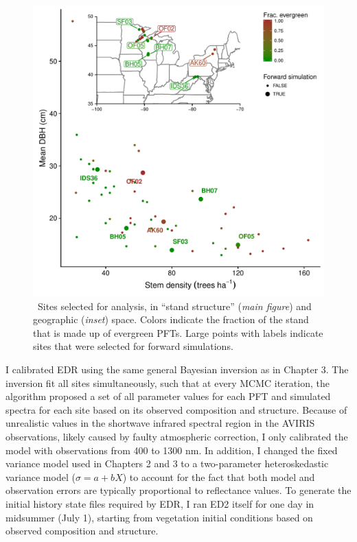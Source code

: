 \begin{figure}
  \centering
  \includegraphics[width=\textwidth]{figures/sites_both.pdf}
  \caption{\
    Sites selected for analysis, in ``stand structure'' (\textit{main figure}) and geographic (\textit{inset}) space.
    Colors indicate the fraction of the stand that is made up of evergreen PFTs.
    Large points with labels indicate sites that were selected for forward simulations.
  }\label{fig:sites}
\end{figure}
% 
% 

I calibrated EDR using the same general Bayesian inversion as in Chapter 3.
The inversion fit all sites simultaneously, such that at every MCMC iteration, the algorithm proposed a set of all parameter values for each PFT and simulated spectra for each site based on its observed composition and structure.
Because of unrealistic values in the shortwave infrared spectral region in the AVIRIS observations, likely caused by faulty atmospheric correction, I only calibrated the model with observations from 400 to 1300 nm.
In addition, I changed the fixed variance model used in Chapters 2 and 3 to a two-parameter heteroskedastic variance model ($\sigma = a + bX$) to account for the fact that both model and observation errors are typically proportional to reflectance values.
To generate the initial history state files required by EDR, I ran ED2 itself for one day in midsummer (July 1), starting from vegetation initial conditions based on observed composition and structure.

